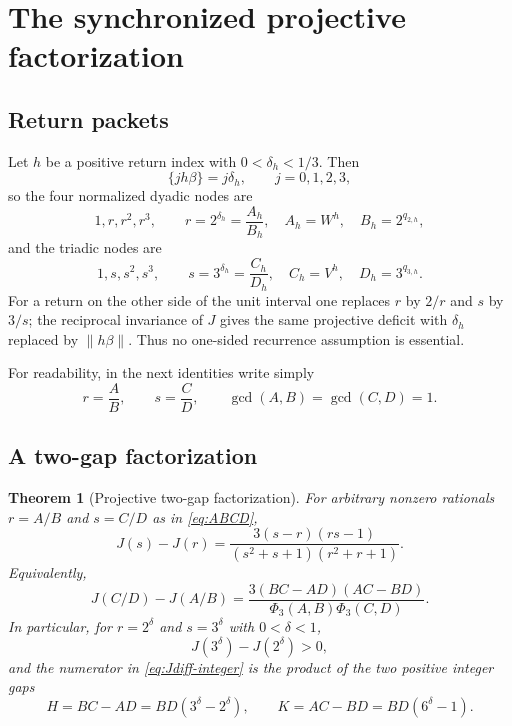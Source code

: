 \documentclass[11pt]{article}
\newtheorem{theorem}{Theorem}[section]
\theoremstyle{definition}
\theoremstyle{remark}
\begin{document}
\section{The synchronized projective factorization}
\label{sec:synchronized-factorization}

\subsection{Return packets}

Let $h$ be a positive return index with $0<\delta_h<1/3$.  Then
\[
 \{jh\beta\}=j\delta_h,
 \qquad j=0,1,2,3,
\]
so the four normalized dyadic nodes are
\[
 1,r,r^2,r^3,
 \qquad
 r=2^{\delta_h}=\frac{A_h}{B_h},
 \quad
 A_h=W^h,
 \quad
 B_h=2^{q_{2,h}},
\]
and the triadic nodes are
\[
 1,s,s^2,s^3,
 \qquad
 s=3^{\delta_h}=\frac{C_h}{D_h},
 \quad
 C_h=V^h,
 \quad
 D_h=3^{q_{3,h}}.
\]
For a return on the other side of the unit interval one replaces $r$ by $2/r$ and $s$ by $3/s$; the reciprocal invariance of $J$ gives the same projective deficit with $\delta_h$ replaced by $\|h\beta\|$.  Thus no one-sided recurrence assumption is essential.

For readability, in the next identities write simply
\begin{equation}\label{eq:ABCD}
 r=\frac AB,
 \qquad
 s=\frac CD,
 \qquad
 \gcd(A,B)=\gcd(C,D)=1.
\end{equation}

\subsection{A two-gap factorization}

\begin{theorem}[Projective two-gap factorization]\label{thm:two-gap}
For arbitrary nonzero rationals $r=A/B$ and $s=C/D$ as in \eqref{eq:ABCD},
\begin{equation}\label{eq:Jdiff-analytic}
 J(s)-J(r)
 =\frac{3(s-r)(rs-1)}{(s^2+s+1)(r^2+r+1)}.
\end{equation}
Equivalently,
\begin{equation}\label{eq:Jdiff-integer}
 J(C/D)-J(A/B)
 =\frac{3(BC-AD)(AC-BD)}
 {\Phi_3(A,B)\Phi_3(C,D)}.
\end{equation}
In particular, for $r=2^\delta$ and $s=3^\delta$ with $0<\delta<1$,
\begin{equation}\label{eq:Jdiff-positive}
 J(3^\delta)-J(2^\delta)>0,
\end{equation}
and the numerator in \eqref{eq:Jdiff-integer} is the product of the two positive integer gaps
\begin{equation}\label{eq:HK}
 H=BC-AD=BD(3^\delta-2^\delta),
 \qquad
 K=AC-BD=BD(6^\delta-1).
\end{equation}
\end{theorem}
\end{document}
